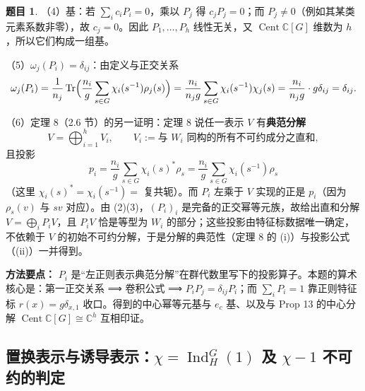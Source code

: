 \documentclass[a4paper]{ctexart}
\theoremstyle{definition}
\newtheorem{example}{题目}[section]
\theoremstyle{analysis}
\theoremstyle{plain}
\begin{document}
\begin{example}
（4）基：若 \(\sum_i c_iP_i=0\)，乘以 \(P_j\) 得 \(c_jP_j=0\)；而 \(P_j\neq 0\)（例如其某类元素系数非零），故 \(c_j=0\)。因此 \(P_1,\dots,P_h\) 线性无关，又 \(\operatorname{Cent}\mathbb C[G]\) 维数为 \(h\)，所以它们构成一组基。

（5）\(\omega_j(P_i)=\delta_{ij}\)：由定义与正交关系
\[
  \omega_j(P_i)
  =\frac{1}{n_j}\operatorname{Tr}\Bigl(\frac{n_i}{g}\sum_{s\in G}\chi_i(s^{-1})\rho_j(s)\Bigr)
  =\frac{n_i}{n_jg}\sum_{s\in G}\chi_i(s^{-1})\chi_j(s)
  =\frac{n_i}{n_jg}\cdot g\delta_{ij}
  =\delta_{ij}.
\]

（6）定理 8（2.6 节）的另一证明：定理 8 说任一表示 \(V\) 有\textbf{典范分解}
\[
  V=\bigoplus_{i=1}^h V_i,\qquad V_i:=\text{与 }W_i\text{ 同构的所有不可约成分之直和},
\]
且投影
\[
  p_i=\frac{n_i}{g}\sum_{s\in G}\chi_i(s)^*\rho_s
  =\frac{n_i}{g}\sum_{s\in G}\chi_i(s^{-1})\rho_s
\]
（这里 \(\chi_i(s)^*=\chi_i(s^{-1})=\) 复共轭）。而 \(P_i\) 左乘于 \(V\) 实现的正是 \(p_i\)（因为 \(\rho_s(v)\) 与 \(sv\) 对应）。由 (2)(3)，\((P_i)_i\) 是完备的正交幂等元族，故给出直和分解 \(V=\bigoplus_i P_iV\)，且 \(P_iV\) 恰是等型为 \(W_i\) 的部分；这些投影由特征标数据唯一确定，不依赖于 \(V\) 的初始不可约分解，于是分解的典范性（定理 8 的 (i)）与投影公式（(ii)）一并得到。

\textbf{方法要点：}
\(P_i\) 是“左正则表示典范分解”在群代数里写下的投影算子。本题的算术核心是：第一正交关系 ⟹ 卷积公式 ⟹ \(P_iP_j=\delta_{ij}P_i\)；而 \(\sum_iP_i=1\) 靠正则特征标 \(r(x)=g\delta_{x,1}\) 收口。得到的中心幂等元基与 \(e_c\) 基、以及与 Prop 13 的中心分解 \(\operatorname{Cent}\mathbb C[G]\cong\mathbb C^h\) 互相印证。
\end{example}

\subsection{\texorpdfstring{置换表示与诱导表示：\(\chi=\operatorname{Ind}_H^G(1)\) 及 \(\chi-1\) 不可约的判定}{置换表示与诱导表示}}\label{subsec:problem-serre-permutation-induced-char}
\end{document}
